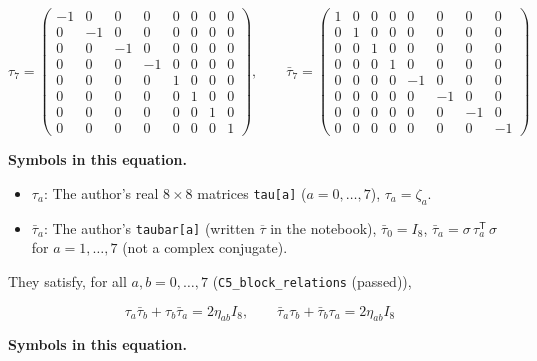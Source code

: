 \documentclass[
  10pt,
]{article}
\providecommand{\tightlist}{%
  \setlength{\itemsep}{0pt}\setlength{\parskip}{0pt}}
\begin{document}
\[
\tau_7 = \begin{pmatrix} -1 & 0 & 0 & 0 & 0 & 0 & 0 & 0 \\ 0 & -1 & 0 & 0 & 0 & 0 & 0 & 0 \\ 0 & 0 & -1 & 0 & 0 & 0 & 0 & 0 \\ 0 & 0 & 0 & -1 & 0 & 0 & 0 & 0 \\ 0 & 0 & 0 & 0 & 1 & 0 & 0 & 0 \\ 0 & 0 & 0 & 0 & 0 & 1 & 0 & 0 \\ 0 & 0 & 0 & 0 & 0 & 0 & 1 & 0 \\ 0 & 0 & 0 & 0 & 0 & 0 & 0 & 1 \end{pmatrix},\qquad \bar\tau_7 = \begin{pmatrix} 1 & 0 & 0 & 0 & 0 & 0 & 0 & 0 \\ 0 & 1 & 0 & 0 & 0 & 0 & 0 & 0 \\ 0 & 0 & 1 & 0 & 0 & 0 & 0 & 0 \\ 0 & 0 & 0 & 1 & 0 & 0 & 0 & 0 \\ 0 & 0 & 0 & 0 & -1 & 0 & 0 & 0 \\ 0 & 0 & 0 & 0 & 0 & -1 & 0 & 0 \\ 0 & 0 & 0 & 0 & 0 & 0 & -1 & 0 \\ 0 & 0 & 0 & 0 & 0 & 0 & 0 & -1 \end{pmatrix}
\]

\textbf{Symbols in this equation.}

\begin{itemize}
\tightlist
\item
  \(\tau_a\): The author's real \(8 \times 8\) matrices
  \texttt{tau{[}a{]}} (\(a = 0, \dots, 7\)), \(\tau_a = \zeta_a\).
\item
  \(\bar\tau_a\): The author's \texttt{taubar{[}a{]}} (written
  \(\overline{\tau}\) in the notebook), \(\bar\tau_0 = I_8\),
  \(\bar\tau_a = \sigma\,\tau_a^{\mathsf T}\,\sigma\) for
  \(a = 1, \dots, 7\) (not a complex conjugate).
\end{itemize}

They satisfy, for all \(a, b = 0, \dots, 7\)
(\texttt{C5\_block\_relations} (passed)),

\[
\tau_a\bar\tau_b + \tau_b\bar\tau_a = 2\eta_{ab}I_8,\qquad \bar\tau_a\tau_b + \bar\tau_b\tau_a = 2\eta_{ab}I_8
\]

\textbf{Symbols in this equation.}
\end{document}
